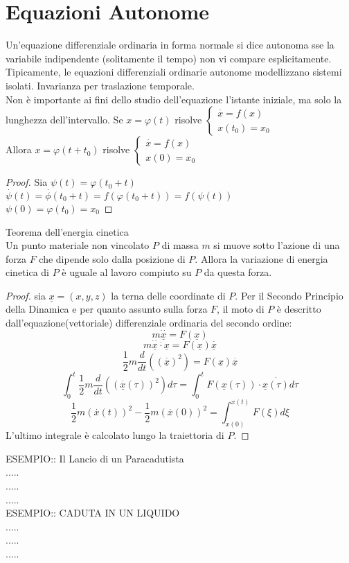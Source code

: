 \section{Equazioni Autonome}
Un'equazione differenziale ordinaria in forma normale si dice autonoma sse la variabile indipendente (solitamente il tempo) non vi compare esplicitamente.
\observation
Tipicamente, le equazioni differenziali ordinarie autonome modellizzano sistemi isolati.
\observation Invarianza per traslazione temporale.\\
Non è importante ai fini dello studio dell'equazione l'istante iniziale, ma solo la lunghezza dell'intervallo.
Se  $x=\varphi(t)$ risolve $\left\{ \begin{matrix} \overset{\cdot}{x} = f(x)\\x(t_0)=x_0 \end{matrix} \right.$\\
Allora $x=\varphi(t+t_0)$ risolve $\left\{ \begin{matrix} \overset{\cdot}{x} = f(x)\\x(0)=x_0 \end{matrix} \right.$\\
\begin{proof}
	Sia $\psi(t)=\varphi(t_0+t)$\\
	$\overset{\cdot}{\psi}(t)=\overset{\cdot}{\phi}(t_0+t)=f(\varphi(t_0+t))=f(\psi(t))$\\
	$\psi(0)=\varphi(t_0)=x_0$ 
\end{proof}
\proposition Teorema dell'energia cinetica\\
Un punto materiale non vincolato $P$ di massa $m$ si muove sotto l'azione di una forza $F$ che dipende solo dalla posizione di $P$. Allora la variazione di energia cinetica di $P$ è uguale al lavoro compiuto su $P$ da questa forza.
\begin{proof}
	sia $\underline{x}=(x,y,z)$ la terna delle coordinate di $P$. Per il Secondo Principio della Dinamica e per quanto assunto sulla forza $F$, il moto di $P$ è descritto dall'equazione(vettoriale) differenziale ordinaria del secondo ordine:\\
	$$m\overset{\cdot\cdot}{\underline{x}}=F(\underline{x})$$
	$$m\overset{\cdot\cdot}{\underline{x}}\overset{\cdot}\cdot{\underline{x}}=F(\underline{x})\overset{\cdot}{\underline{x}}$$
	$$\frac{1}{2}m\frac{d}{dt}\left(\left(\overset{\cdot}{\underline{x}}\right)^2\right)=F(\underline{x})\overset{\cdot}{\underline{x}}$$
	$$\int_{0}^t\frac{1}{2}m\frac{d}{dt}\left(\left(\overset{\cdot}{\underline{x}}(\tau)\right)^2\right)d\tau=\int_{0}^tF(\underline{x}(\tau))\cdot\overset{\cdot}{\underline{x}(\tau)}d\tau$$
	$$\frac{1}{2}m\left(\overset{\cdot}{x}(t)\right)^2-\frac{1}{2}m\left(\overset{\cdot}{x}(0)\right)^2 = \int_{x(0)}^{x(t)}F(\xi)d\xi$$
	L'ultimo integrale è calcolato lungo la traiettoria di $P$.
\end{proof}
ESEMPIO:: Il Lancio di un Paracadutista\\
.....\\
.....\\
.....\\
ESEMPIO:: CADUTA IN UN LIQUIDO\\
.....\\
.....\\
.....\\
